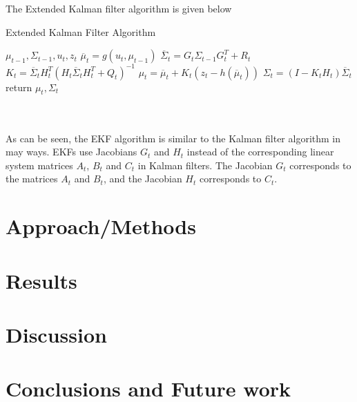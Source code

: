 \documentclass[conference]{IEEEtran}
\begin{document}
The Extended Kalman filter algorithm is given below

\begin{minipage}{\linewidth}
  \begin{algorithm}[H]
    \caption{Extended Kalman Filter Algorithm}\label{AlgEkf}
    \begin{algorithmic}[1]
       {$\mu_{t-1},\Sigma_{t-1}, u_t,z_t$}
	\State $\overline \mu_t = g(u_t, \mu_{t-1})$
	\State $\overline \Sigma_t= G_t \Sigma_{t-1} G_t^T + R_t$  
	\State $K_t = \overline \Sigma_t H_t^T{(H_t \overline \Sigma_t H_t^T + Q_t)}^{-1}$
	\State $\mu_t = \overline \mu_t + K_t(z_t - h(\overline \mu_t))$
	\State $\Sigma_t = (I - K_t H_t) \overline \Sigma_t$
	\State return $\mu_t, \Sigma_t$
      \EndProcedure
    \end{algorithmic}
  \end{algorithm}
\end{minipage}\\\\

As can be seen, the EKF algorithm is similar to the Kalman filter algorithm in may ways. EKFs use Jacobians $G_t$ and $H_t$ instead of the corresponding linear system matrices $A_t$, $B_t$ and $C_t$ in Kalman filters. The Jacobian $G_t$ corresponds to the matrices $A_t$ and $B_t$, and the Jacobian $H_t$ corresponds to $C_t$.
\section{Approach/Methods}
\section{Results}
\section{Discussion}
\section{Conclusions and Future work}
%
%
\end{document}
